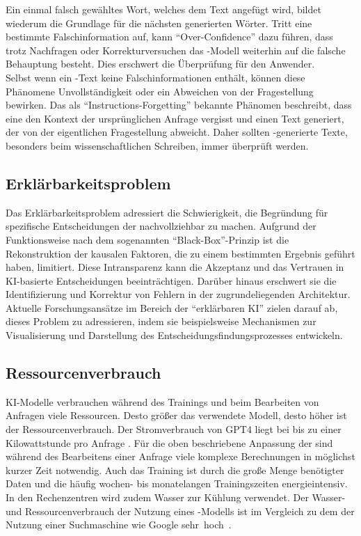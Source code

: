 \documentclass[../main.tex]{subfiles}
\begin{document}
Ein einmal falsch gewähltes Wort, welches dem Text angefügt wird, bildet wiederum die Grundlage für die nächsten generierten Wörter. Tritt eine bestimmte Falschinformation auf, 
kann "`Over-Confidence"' dazu führen, dass trotz Nachfragen oder Korrekturversuchen das -Modell weiterhin auf die falsche Behauptung besteht. Dies erschwert die 
Überprüfung für den Anwender. \cite{allgemHalluzinationen,softmax} \\
Selbst wenn ein -Text keine Falschinformationen enthält, können diese Phänomene Unvollständigkeit oder ein Abweichen von der Fragestellung bewirken. Das als 
"`Instructions-Forgetting"' bekannte Phänomen beschreibt, dass eine  den Kontext der ursprünglichen Anfrage vergisst und einen Text generiert, der von der 
eigentlichen Fragestellung abweicht. Daher sollten -generierte Texte, besonders beim wissenschaftlichen Schreiben, immer überprüft werden.\cite{allgemHalluzinationen}


\subsection{Erklärbarkeitsproblem}
\label{sec:erklärbarkeitsproblem}

Das Erklärbarkeitsproblem adressiert die Schwierigkeit, die Begründung für spezifische Entscheidungen der  nachvollziehbar zu machen. Aufgrund der Funktionsweise nach dem sogenannten 
"`Black-Box"'-Prinzip ist die Rekonstruktion der kausalen Faktoren, die zu einem bestimmten Ergebnis geführt haben, limitiert. Diese Intransparenz kann die Akzeptanz und das Vertrauen in 
KI-basierte Entscheidungen beeinträchtigen. Darüber hinaus erschwert sie die Identifizierung und Korrektur von Fehlern in der zugrundeliegenden Architektur. Aktuelle Forschungsansätze 
im Bereich der "`erklärbaren KI"' zielen darauf ab, dieses Problem zu adressieren, indem sie beispielsweise Mechanismen zur Visualisierung und Darstellung des 
Entscheidungsfindungsprozesses entwickeln.\cite{explainable}
 

\subsection{Ressourcenverbrauch}

KI-Modelle verbrauchen während des Trainings und beim Bearbeiten von Anfragen viele Ressourcen. Desto größer das verwendete Modell, desto höher ist der Ressourcenverbrauch. 
Der Stromverbrauch von GPT4 liegt bei bis zu einer Kilowattstunde pro Anfrage \cite{Energieverbrauch}. Für die oben beschriebene Anpassung der  sind während des Bearbeitens einer Anfrage viele 
komplexe Berechnungen in möglichst kurzer Zeit notwendig. Auch das Training ist durch die große Menge benötigter Daten und die häufig wochen- bis monatelangen Trainingszeiten 
energieintensiv. In den Rechenzentren wird zudem Wasser zur Kühlung verwendet. Der Wasser-und Ressourcenverbrauch der Nutzung eines -Modells ist im Vergleich zu dem der Nutzung einer 
Suchmaschine wie Google \mbox{sehr hoch \cite{KINachhaltigkeit}.} 
\end{document}
